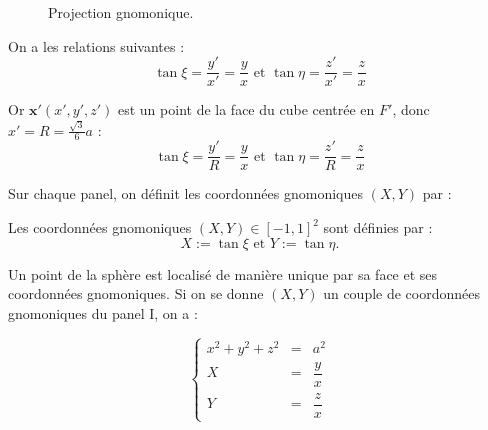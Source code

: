 \begin{figure}[htbp]
\begin{center}
\end{center}
\caption{Projection gnomonique.}
\label{fig: projection gnomonique}
\end{figure}  

On a les relations suivantes :
\begin{equation}
\tan \xi = \dfrac{y'}{x'} = \dfrac{y}{x} \text{ et } \tan \eta = \dfrac{z'}{x'} = \dfrac{z}{x}
\end{equation}

Or $\mathbf{x}'(x',y',z')$ est un point de la face du cube centrée en $F'$, donc $x'=R=\frac{\sqrt{3}}{6}a$ :
\begin{equation}
\tan \xi = \dfrac{y'}{R} = \dfrac{y}{x} \text{ et } \tan \eta = \dfrac{z'}{R} = \dfrac{z}{x}
\end{equation}

Sur chaque panel, on définit les coordonnées gnomoniques $(X,Y)$ par :

\begin{definition}
Les coordonnées gnomoniques $(X,Y) \in [-1,1]^2$ sont définies par :
\begin{equation}
X:=\tan \xi \text{ et } Y:= \tan \eta.
\end{equation}
\end{definition}

Un point de la sphère est localisé de manière unique par sa face et ses coordonnées gnomoniques. Si on se donne $(X,Y)$ un couple de coordonnées gnomoniques du panel I, on a :

\begin{equation}
\left\lbrace
\begin{array}{rcl}
x^2+y^2+z^2 & = & a^2\\
X & = & \dfrac{y}{x} \\
Y & = & \dfrac{z}{x}
\end{array}
\right.
\end{equation}

